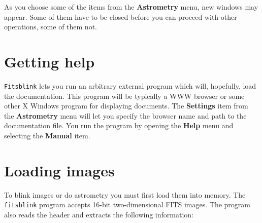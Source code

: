 \documentclass[11pt]{article}
\begin{document}
As you choose some of the items from the \textbf{Astrometry} menu, new
windows may appear.  Some of them have to be closed before you can
proceed with other operations, some of them not.


\section{Getting help}

\verb=Fitsblink= lets you run an arbitrary external program which
will, hopefully, load the documentation.  This program will be
typically a WWW browser or some other X Windows program for displaying
documents.  The \textbf{Settings} item from the \textbf{Astrometry}
menu will let you specify the browser name and path to the
documentation file.  You run the program by opening the \textbf{Help}
menu and selecting the \textbf{Manual} item.

\section{Loading images}
\label{loading}
To blink images or do astrometry you must first load them into memory.
The \verb=fitsblink= program accepts 16-bit two-dimensional FITS
images.  The program also reads the header and extracts the following
information:
\end{document}
